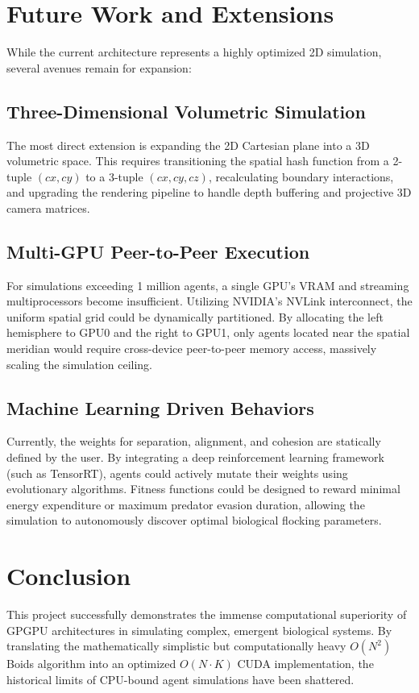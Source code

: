\documentclass[12pt,a4paper]{report}
\begin{document}
\chapter{Future Work and Extensions}
While the current architecture represents a highly optimized 2D simulation, several avenues remain for expansion:

\section{Three-Dimensional Volumetric Simulation}
The most direct extension is expanding the 2D Cartesian plane into a 3D volumetric space. This requires transitioning the spatial hash function from a 2-tuple $(cx, cy)$ to a 3-tuple $(cx, cy, cz)$, recalculating boundary interactions, and upgrading the rendering pipeline to handle depth buffering and projective 3D camera matrices.

\section{Multi-GPU Peer-to-Peer Execution}
For simulations exceeding 1 million agents, a single GPU's VRAM and streaming multiprocessors become insufficient. Utilizing NVIDIA's NVLink interconnect, the uniform spatial grid could be dynamically partitioned. By allocating the left hemisphere to GPU0 and the right to GPU1, only agents located near the spatial meridian would require cross-device peer-to-peer memory access, massively scaling the simulation ceiling.

\section{Machine Learning Driven Behaviors}
Currently, the weights for separation, alignment, and cohesion are statically defined by the user. By integrating a deep reinforcement learning framework (such as TensorRT), agents could actively mutate their weights using evolutionary algorithms. Fitness functions could be designed to reward minimal energy expenditure or maximum predator evasion duration, allowing the simulation to autonomously discover optimal biological flocking parameters.

\chapter{Conclusion}
This project successfully demonstrates the immense computational superiority of GPGPU architectures in simulating complex, emergent biological systems. By translating the mathematically simplistic but computationally heavy $O(N^2)$ Boids algorithm into an optimized $O(N \cdot K)$ CUDA implementation, the historical limits of CPU-bound agent simulations have been shattered. 
\end{document}
